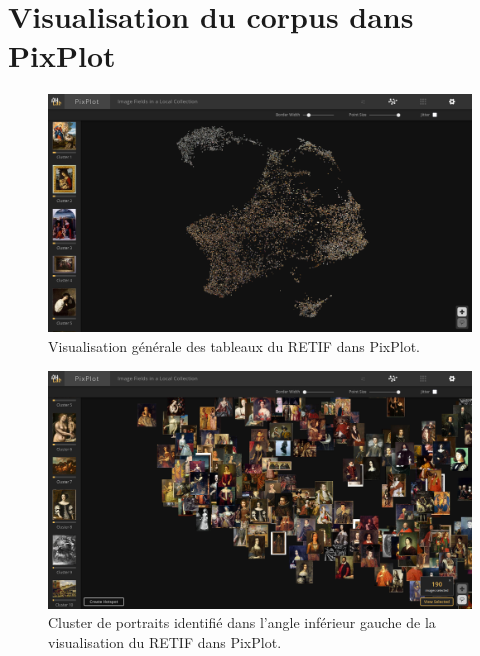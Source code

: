 \section{Visualisation du corpus dans PixPlot}

\begin{figure}[H]
    \centering
    \includegraphics[width=1\textwidth]{annexes/figures/PP-generale.png}
    \caption{Visualisation générale des tableaux du RETIF dans PixPlot.}
    \label{fig:PP-general}
\end{figure}

\begin{figure}[H]
    \centering
    \includegraphics[width=1\textwidth]{annexes/figures/PP-portraits.png}
    \caption{Cluster de portraits identifié dans l'angle inférieur gauche de la visualisation du RETIF dans PixPlot.}
    \label{fig:PP-portraits}
\end{figure}

